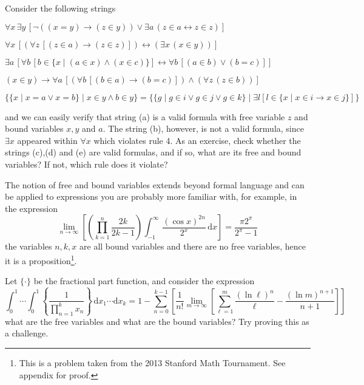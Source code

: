 \documentclass[11pt]{book}
\newcommand{\env}[2]{\begin{#1}#2\end{#1}}
\begin{document}
\env{example}{
	Consider the following strings
	\env{abc}{
		\item $\forall x\,\exists y \, [\neg ((x=y)\rightarrow (z\in y))\lor \exists a\, (z\in a \leftrightarrow z\in z)]$
		\item  $\forall x\,[(\forall z \,[(z\in a)\rightarrow (z\in z)])\leftrightarrow (\exists x\, (x\in y))]$
		\item $\exists a \,[\forall b\,[b\in \{x\mid (a\in x)\land (x\in c)\}]\leftrightarrow \forall b\,[(a\in b)\lor (b=c)]]$
		\item $(x\in y)\rightarrow \forall a\, [(\forall b\,[(b\in a)\rightarrow (b=c)])\land (\forall z\, (z\in b))]$
		\item $\{\{x\mid x=a\lor x=b\}\mid x\in y\land b\in y\}=\{\{g\mid g\in i\lor g\in j\lor g\in k \}\mid \exists l [l\in \{x\mid x\in i\rightarrow x\in j\}]\}$
	}
	and we can easily verify that string (a) is a valid formula with free variable $z$ and bound variables $x,y$ and $a$. The string (b), however, is not a valid formula, since $\exists x$ appeared within $\forall x$ which violates rule 4. As an exercise, check whether the strings (c),(d) and (e) are valid formulas, and if so, what are its free and bound variables? If not, which rule does it violate?
}
The notion of free and bound variables extends beyond formal language and can be applied to expressions you are probably more familiar with, for example, in the expression
\[\lim _{n \rightarrow \infty}\left[\left(\prod_{k=1}^{n} \frac{2 k}{2 k-1}\right) \int_{-1}^{\infty} \frac{(\cos x)^{2 n}}{2^{x}}\,\mathrm d x\right]=\frac{\pi 2^\pi}{2^\pi-1}\]
the variables $n,k,x$ are all bound variables and there are no free variables, hence it is a proposition\footnote{This is a problem taken from the 2013 Stanford Math Tournament. See appendix for proof.}.\vspace{-3mm}
\env{exercise}{
	Let $\{\cdot\}$ be the fractional part function, and consider the expression
	\[\int_{0}^{1} \cdots \int_{0}^{1}\left\{\frac{1}{\prod_{n=1}^{k} x_{n}}\right\} \,\mathrm d x_{1} \cdots\mathrm d x_{k}=1-\sum_{n=0}^{k-1} \left[\frac{1}{n!}\lim _{m \rightarrow \infty}\left[\sum_{\ell=1}^{m} \frac{(\ln \ell)^{n}}{\ell}-\frac{(\ln m)^{n+1}}{n+1}\right]\right]\]
	what are the free variables and what are the bound variables? Try proving this as a challenge.
}
\end{document}

